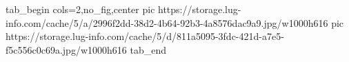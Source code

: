  
 
 
 
 


\ifcmt
  tab_begin cols=2,no_fig,center
     pic https://storage.lug-info.com/cache/5/a/2996f2dd-38d2-4b64-92b3-4a8576dac9a9.jpg/w1000h616%
		 pic https://storage.lug-info.com/cache/5/d/811a5095-3fdc-421d-a7e5-f5c556c0c69a.jpg/w1000h616%
  tab_end
\fi
